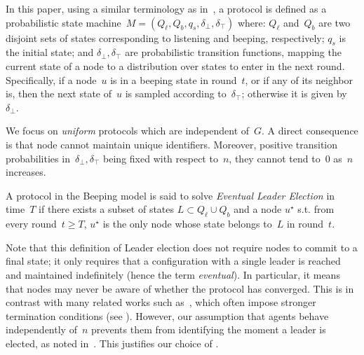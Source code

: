 \documentclass{article}
\newcommand{\rnote}[1]{{\color{myred} ({\bf Robin:} #1)}}
\newcommand{\inote}[1]{{\color{blue} ({\bf Isa:} #1)}}
\begin{document}
In this paper, using a similar terminology as in~\cite{gilbert_computational_2015}, a protocol is defined as a probabilistic state machine~$M = (Q_\ell, Q_b, q_s, \delta_\bot, \delta_\top)$ where: $Q_\ell$ and~$Q_b$ are two disjoint sets of states corresponding to listening and beeping, respectively; $q_s$ is the initial state; and $\delta_\bot, \delta_\top$ are probabilistic transition functions, mapping the current state of a node to a distribution over states to enter in the next round.
Specifically, if a node~$u$ is in a beeping state in round~$t$, or if any of its neighbor is, then the next state of~$u$ is sampled according to~$\delta_\top$; otherwise it is given by~$\delta_\bot$.

We focus on {\em uniform} protocols which are independent of~$G$. A direct consequence is that node cannot maintain unique identifiers. Moreover, positive transition probabilities in~$\delta_\bot, \delta_\top$ being fixed with respect to~$n$, they cannot tend to~$0$ as~$n$ increases.

\begin{definition} \label{def:eventual_LE}
A protocol in the Beeping model is said to solve \textit{Eventual Leader Election} in time~$T$ if there exists a subset of states $L \subset Q_\ell \cup Q_b$ and a node $u^\star$ s.t. from every round~$t \geq T$, $u^\star$ is the only node whose state belongs to~$L$ in round~$t$.
\end{definition}

Note that this definition of Leader election does not require nodes to commit to a final state; it only requires that a configuration with a single leader is reached and maintained indefinitely (hence the term {\em eventual}). In particular, it means that nodes may never be aware of whether the protocol has converged. This is in contrast with many related works such as~\cite{DufoulonBB18}, which often impose stronger termination conditions (see ).
However, our assumption that agents behave independently of~$n$ prevents them from identifying the moment a leader is elected, as noted in~\cite{itai_symmetry_1990}. This justifies our choice of .
\end{document}

